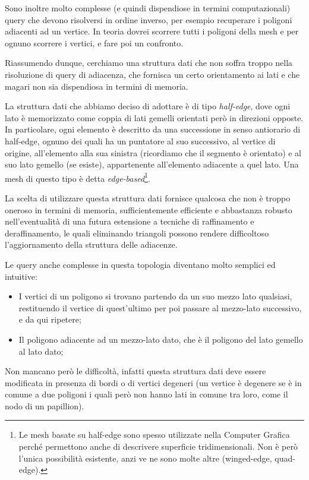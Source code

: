 Sono inoltre molto complesse (e quindi dispendiose in termini computazionali) query che devono risolversi in ordine inverso, per esempio recuperare i poligoni adiacenti ad un vertice. In teoria dovrei scorrere tutti i poligoni della mesh e per ognuno scorrere i vertici, e fare poi un confronto.

Riassumendo dunque, cerchiamo una struttura dati che non soffra troppo nella risoluzione di query di adiacenza, che fornisca un certo orientamento ai lati e che magari non sia dispendiosa in termini di memoria.

La struttura dati che abbiamo deciso di adottare è di tipo \emph{half-edge}, dove ogni lato è memorizzato come coppia di lati gemelli orientati però in direzioni opposte. In particolare, ogni elemento è descritto da una successione in senso antiorario di half-edge, ognuno dei quali ha un puntatore al suo successivo, al vertice di origine, all'elemento alla sua sinistra (ricordiamo che il segmento è orientato) e al suo lato gemello (se esiste), appartenente all'elemento adiacente a quel lato. Una mesh di questo tipo è detta \emph{edge-based}\footnote{Le mesh basate su half-edge sono spesso utilizzate nella Computer Grafica perché permettono anche di descrivere superficie tridimensionali. Non è però l'unica possibilità esistente, anzi ve ne sono molte altre (winged-edge, quad-edge).}.

La scelta di utilizzare questa struttura dati fornisce qualcosa che non è troppo oneroso in termini di memoria, sufficientemente efficiente e abbastanza robusto nell'eventualità di una futura estensione a tecniche di raffinamento e deraffinamento, le quali eliminando triangoli possono rendere difficoltoso l'aggiornamento della struttura delle adiacenze.

Le query anche complesse in questa topologia diventano molto semplici ed intuitive: 
\begin{itemize}
\item I vertici di un poligono si trovano partendo da un suo mezzo lato qualsiasi, restituendo il vertice di quest'ultimo per poi passare al mezzo-lato successivo, e da qui ripetere; 
\item Il poligono adiacente ad un mezzo-lato dato, che è il poligono del lato gemello al lato dato;
\end{itemize}
Non mancano però le difficoltà, infatti questa struttura dati deve essere modificata in presenza di bordi o di vertici degeneri (un vertice è degenere se è in comune a due poligoni i quali però non hanno lati in comune tra loro, come il nodo di un papillion).

